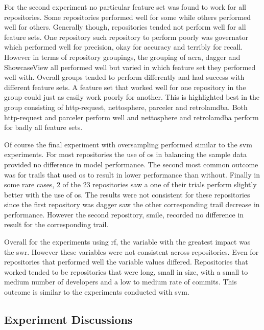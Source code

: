 For the second experiment no particular feature set was found to work for all repositories. Some repositories performed well for some while others performed well for others. Generally though, repositories tended not perform well for all feature sets. One repository such repository to perform poorly was governator which performed well for precision, okay for accuracy and terribly for recall. However in terms of repository groupings, the grouping of acra, dagger and ShowcaseView all performed well but varied in which feature set they performed well with. Overall groups tended to perform differently and had success with different feature sets. A feature set that worked well for one repository in the group could just as easily work poorly for another. This is highlighted best in the group consisting of http-request, nettosphere, parceler and retrolamdba. Both http-request and parceler perform well and nettosphere and retrolamdba perform for badly all feature sets.

Of course the final experiment with oversampling performed similar to the \gls{svm} experiments. For most repositories the use of \gls{os} in balancing the sample data provided no difference in model performance. The second most common outcome was for trails that used \gls{os} to result in lower performance than without. Finally in some rare cases, 2 of the 23 repositories saw a one of their trials perform slightly better with the use of \gls{os}. The results were not consistent for these repositories since the first repository was dagger saw the other corresponding trail decrease in performance. However the second repository, smile, recorded no difference in result for the corresponding trail.

Overall for the experiments using \gls{rf}, the variable with the greatest impact was the \gls{swr}. However these variables were not consistent across repositories. Even for repositories that performed well the variable values differed. Repositories that worked tended to be repositories that were long, small in size, with a small to medium number of developers and a low to medium rate of commits. This outcome is similar to the experiments conducted with \gls{svm}.

\subsection{Experiment Discussions}

